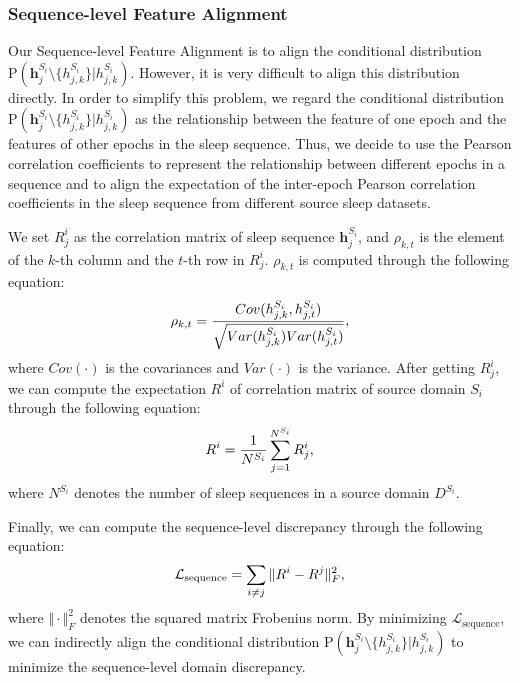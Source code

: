 \documentclass[letterpaper]{article} %
\begin{document}
	\subsubsection{Sequence-level Feature Alignment}
	Our Sequence-level Feature Alignment is to align the conditional distribution $\mathrm{P}(\mathrm{\mathbf{h}}^{S_i}_j\setminus \{h^{S_i}_{j, k}\}|h^{S_i}_{j, k})$.
	However, it is very difficult to align this distribution directly.
	In order to simplify this problem, we regard the conditional distribution $\mathrm{P}(\mathrm{\mathbf{h}}^{S_i}_j\setminus \{h^{S_i}_{j, k}\}|h^{S_i}_{j, k})$ as the relationship between the feature of one epoch and the features of other epochs in the sleep sequence.
	Thus, we decide to use the Pearson correlation coefficients to represent the relationship between different epochs in a sequence and to align the expectation of the inter-epoch Pearson correlation coefficients in the sleep sequence from different source sleep datasets.


	We set $R^i_j$ as the correlation matrix of sleep sequence $\mathrm{\mathbf{h}}^{S_i}_j$, and $\rho_{k, t}$ is the element of the $k$-th column and the $t$-th row in $R^i_j$.
	$\rho_{k, t}$ is computed through the following equation:
	\begin{equation}
		\small
		\rho_{k, t}=\frac{Cov(h^{S_i}_{j, k}, h^{S_i}_{j, t})}{\sqrt{Var(h^{S_i}_{j, k})Var(h^{S_i}_{j, t})}},
	\end{equation}
	where $Cov(\cdot)$ is the covariances and $Var(\cdot)$ is the variance.
	After getting $R^i_j$, we can compute the expectation $R^i$ of correlation matrix of source domain $S_i$ through the following equation:
	\begin{equation}
		\small
		R^i = \frac{1}{N^{S_i}} \sum_{j=1}^{N^{S_i}} R^i_j,
	\end{equation}
	where $N^{S_i}$ denotes the number of sleep sequences in a source domain $D^{S_i}$.

	Finally, we can compute the sequence-level discrepancy through the following equation:
	\begin{equation}
		\label{eq:sequence}
		\small
		\mathcal{L}_{\mathrm{sequence}} =  \sum_{i \neq j}\Vert R^i - R^j \Vert^2_F,
	\end{equation}
	where $\Vert \cdot \Vert^2_F$ denotes the squared matrix Frobenius norm.
	By minimizing $\mathcal{L}_{\mathrm{sequence}}$, we can indirectly align the conditional distribution $\mathrm{P}(\mathrm{\mathbf{h}}^{S_i}_j\setminus \{h^{S_i}_{j, k}\}|h^{S_i}_{j, k})$ to minimize the sequence-level domain discrepancy.
\end{document}
